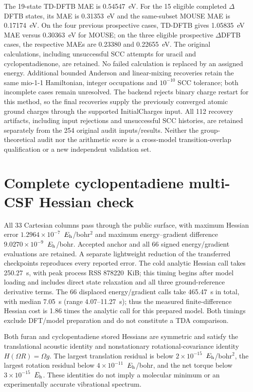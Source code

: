 \documentclass[11pt,a4paper]{article}
\newcommand{\Eh}{\ensuremath{E_{\rm h}}}
\begin{document}
The 19-state TD-DFTB MAE is 0.54547~eV. For the 15 eligible completed $\Delta$DFTB states, its MAE is 0.31353~eV and the same-subset MOUSE MAE is 0.17174~eV. On the four previous prospective cases, TD-DFTB gives 1.05835~eV MAE versus 0.30363~eV for MOUSE; on the three eligible prospective $\Delta$DFTB cases, the respective MAEs are 0.23380 and 0.22655~eV. The original calculations, including unsuccessful SCC attempts for uracil and cyclopentadienone, are retained. No failed calculation is replaced by an assigned energy. Additional bounded Anderson and linear-mixing recoveries retain the same mio-1-1 Hamiltonian, integer occupations and $10^{-10}$ SCC tolerance; both incomplete cases remain unresolved. The backend rejects binary charge restart for this method, so the final recoveries supply the previously converged atomic ground charges through the supported InitialCharges input. All 112 recovery artifacts, including input rejections and unsuccessful SCC histories, are retained separately from the 254 original audit inputs/results. Neither the group-theoretical audit nor the arithmetic score is a cross-model transition-overlap qualification or a new independent validation set.


\section{Complete cyclopentadiene multi-CSF Hessian check}
All 33 Cartesian columns pass through the public surface, with maximum Hessian error $1.2964\times10^{-7}$~\Eh/bohr$^2$ and maximum energy--gradient difference $9.0270\times10^{-9}$~\Eh/bohr. Accepted anchor and all 66 signed energy/gradient evaluations are retained. A separate lightweight reduction of the transferred checkpoints reproduces every reported error. The cold analytic Hessian call takes 250.27~s, with peak process RSS 878220~KiB; this timing begins after model loading and includes direct state relaxation and all three ground-reference derivative terms. The 66 displaced energy/gradient calls take 465.47~s in total, with median 7.05~s (range 4.07--11.27~s); thus the measured finite-difference Hessian cost is 1.86 times the analytic call for this prepared model. Both timings exclude DFT/model preparation and do not constitute a TDA comparison.

Both furan and cyclopentadiene stored Hessians are symmetric and satisfy the translational acoustic identity and nonstationary rotational-covariance identity $H(\Omega R)=\Omega g$. The largest translation residual is below $2\times10^{-15}$~\Eh/bohr$^2$, the largest rotation residual below $4\times10^{-11}$~\Eh/bohr, and the net torque below $3\times10^{-15}$~\Eh. These identities do not imply a molecular minimum or an experimentally accurate vibrational spectrum.

\end{document}
